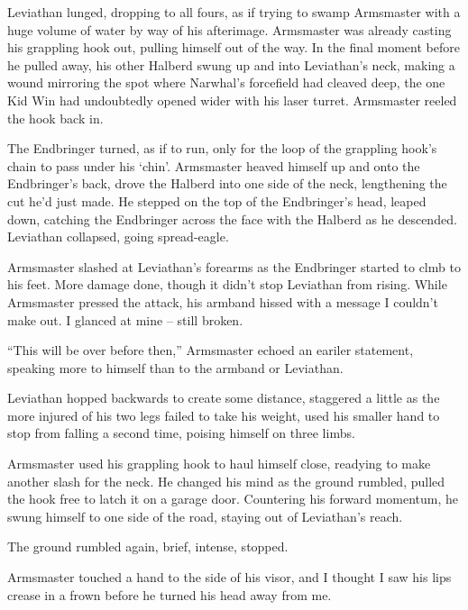 Leviathan lunged, dropping to all fours, as if trying to swamp Armsmaster with a huge volume of water by way of his afterimage.  Armsmaster was already casting his grappling hook out, pulling himself out of the way.  In the final moment before he pulled away, his other Halberd swung up and into Leviathan's neck, making a wound mirroring the spot where Narwhal's forcefield had cleaved deep, the one Kid Win had undoubtedly opened wider with his laser turret.  Armsmaster reeled the hook back in.



The Endbringer turned, as if to run, only for the loop of the grappling hook's chain to pass under his `chin'.  Armsmaster heaved himself up and onto the Endbringer's back, drove the Halberd into one side of the neck, lengthening the cut he'd just made.  He stepped on the top of the Endbringer's head, leaped down, catching the Endbringer across the face with the Halberd as he descended.  Leviathan collapsed, going spread-eagle.



Armsmaster slashed at Leviathan's forearms as the Endbringer started to clmb to his feet.  More damage done, though it didn't stop Leviathan from rising.  While Armsmaster pressed the attack, his armband hissed with a message I couldn't make out.  I glanced at mine – still broken.



``This will be over before then,'' Armsmaster echoed an eariler statement, speaking more to himself than to the armband or Leviathan.



Leviathan hopped backwards to create some distance, staggered a little as the more injured of his two legs failed to take his weight, used his smaller hand to stop from falling a second time, poising himself on three limbs.



Armsmaster used his grappling hook to haul himself close, readying to make another slash for the neck.  He changed his mind as the ground rumbled, pulled the hook free to latch it on a garage door.  Countering his forward momentum, he swung himself to one side of the road, staying out of Leviathan's reach.



The ground rumbled again, brief, intense, stopped.



Armsmaster touched a hand to the side of his visor, and I thought I saw his lips crease in a frown before he turned his head away from me.



